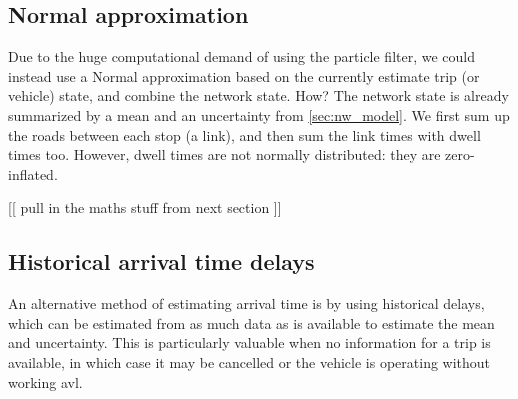 % 
\subsection{Normal approximation}
\label{sec:trip_travel_time_normal}

Due to the huge computational demand of using the particle filter, we could instead use a Normal approximation based on the currently estimate trip (or vehicle) state, and combine the network state. How? The network state is already summarized by a mean and an uncertainty from \cref{sec:nw_model}. We first sum up the roads between each stop (a link), and then sum the link times with dwell times too. However, dwell times are not normally distributed: they are zero-inflated.

[[ pull in the maths stuff from next section ]]

% 
\subsection{Historical arrival time delays}
\label{sec:trip_travel_time_historical}

An alternative method of estimating arrival time is by using historical delays, which can be estimated from as much data as is available to estimate the mean and uncertainty. This is particularly valuable when no information for a trip is available, in which case it may be cancelled or the vehicle is operating without working \gls{avl}.


% 
